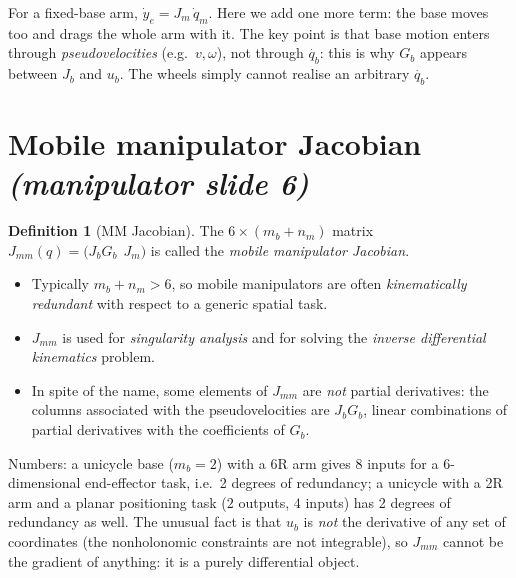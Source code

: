 \documentclass[11pt,a4paper]{article}
\def\bm#1{#1}%
\newcommand{\qbase}{\bm{q}_b}
\newcommand{\ubase}{\bm{u}_b}
\newcommand{\Gbase}{\bm{G}_b}
\newcommand{\Jbase}{\bm{J}_b}
\newcommand{\Jarm}{\bm{J}_m}
\newcommand{\Jmm}{\bm{J}_{mm}}
\theoremstyle{definition}
\newtheorem{definition}{Definition}[section]
\theoremstyle{plain}
\theoremstyle{remark}
\begin{document}
\begin{intuition}
For a fixed-base arm, $\dot{\bm y}_e=\Jarm\,\dot{\bm q}_m$. Here we add one more term: the base moves too and drags the whole arm with it. The key point is that base motion enters through \emph{pseudovelocities} (e.g.\ $v,\omega$), not through $\dot{\qbase}$: this is why $\Gbase$ appears between $\Jbase$ and $\ubase$. The wheels simply cannot realise an arbitrary $\dot{\qbase}$.
\end{intuition}

\section{Mobile manipulator Jacobian \emph{(manipulator slide 6)}}

\begin{definition}[MM Jacobian]
The $6\times(m_b+n_m)$ matrix $\Jmm(\bm q)=\bigl(\Jbase\Gbase\ \ \Jarm\bigr)$ is called the \emph{mobile manipulator Jacobian}.
\end{definition}

\begin{itemize}[leftmargin=*]
\item Typically $m_b+n_m>6$, so mobile manipulators are often \emph{kinematically redundant} with respect to a generic spatial task.
\item $\Jmm$ is used for \emph{singularity analysis} and for solving the \emph{inverse differential kinematics} problem.
\item In spite of the name, some elements of $\Jmm$ are \emph{not} partial derivatives: the columns associated with the pseudovelocities are $\Jbase\Gbase$, linear combinations of partial derivatives with the coefficients of $\Gbase$.
\end{itemize}

\begin{intuition}
Numbers: a unicycle base ($m_b=2$) with a 6R arm gives 8 inputs for a 6-dimensional end-effector task, i.e.\ 2 degrees of redundancy; a unicycle with a 2R arm and a planar positioning task ($2$ outputs, $4$ inputs) has 2 degrees of redundancy as well. The unusual fact is that $\bm u_b$ is \emph{not} the derivative of any set of coordinates (the nonholonomic constraints are not integrable), so $\Jmm$ cannot be the gradient of anything: it is a purely differential object.
\end{intuition}

\end{document}
